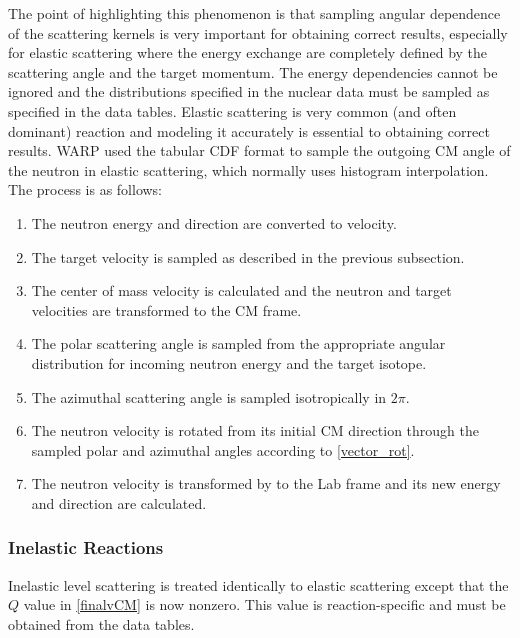 The point of highlighting this phenomenon is that sampling angular dependence of the scattering kernels is very important for obtaining correct results, especially for elastic scattering where the energy exchange are completely defined by the scattering angle and the target momentum.  The energy dependencies cannot be ignored and the distributions specified in the nuclear data must be sampled as specified in the data tables.  Elastic scattering is very common (and often dominant) reaction and modeling it accurately is essential to obtaining correct results.
WARP used the tabular CDF format to sample the outgoing CM angle of the neutron in elastic scattering, which normally uses histogram interpolation.  The process is as follows:    
\begin{enumerate}
 \item The neutron energy and direction are converted to velocity.
 \item The target velocity is sampled as described in the previous subsection.
 \item The center of mass velocity is calculated and the neutron and target velocities are transformed to the CM frame.
 \item The polar scattering angle is sampled from the appropriate angular distribution for incoming neutron energy and the target isotope.
 \item The azimuthal scattering angle is sampled isotropically in $2\pi$.
 \item The neutron velocity is rotated from its initial CM direction through the sampled polar and azimuthal angles according to \eqref{vector_rot}.
 \item The neutron velocity is transformed by to the Lab frame and its new energy and direction are calculated.
\end{enumerate}

\subsubsection{Inelastic Reactions}

Inelastic level scattering is treated identically to elastic scattering except that the $Q$ value in \eqref{finalvCM} is now nonzero.  This value is reaction-specific and must be obtained from the data tables.  


